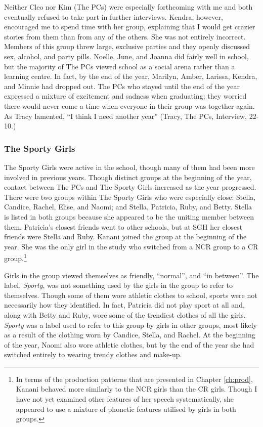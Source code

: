 
Neither Cleo nor Kim (The PCs) were especially forthcoming with me and both eventually refused to take part in further interviews. Kendra, however, encouraged me to spend time with her group, explaining that I would get crazier stories from them than from any of the others. She was not entirely incorrect. Members of this group threw large, exclusive parties and they openly discussed sex, alcohol, and party pills. Noelle, June, and Joanna did fairly well in school, but the majority of The PCs viewed school as a social arena rather than a learning centre. In fact, by the end of the year, Marilyn, Amber, Larissa, Kendra, and Minnie had dropped out. The PCs who stayed until the end of the year expressed a mixture of excitement and sadness when graduating; they worried there would never come a time when everyone in their group was together again. As Tracy lamented, ``I think I need another year'' (Tracy, The PCs, Interview, 22-10.)




\subsubsection{The Sporty Girls}
The Sporty Girls were active in the school, though many of them had been more involved in previous years. Though distinct groups at the beginning of the year, contact between The PCs and The Sporty Girls increased as the year progressed. There were two groups within The Sporty Girls who were especially close: Stella, Candice, Rachel, Elise, and Naomi; and Stella, Patricia, Ruby, and Betty. Stella is listed in both groups because she appeared to be the uniting member between them. Patricia's closest friends went to other schools, but at SGH her closest friends were Stella and Ruby. Kanani joined the group at the beginning of the year. She was the only girl in the study who switched from a NCR group to a CR group.\footnote{In terms of the production patterns that are presented in Chapter \ref{ch:prod}, Kanani behaved more similarly to the NCR girls than the CR girls. Though I have not yet examined other features of her speech systematically, she appeared to use a mixture of phonetic features utilised by girls in both groups.}

Girls in the group viewed themselves as friendly, ``normal'', and ``in between''. The label, \textsl{Sporty}, was not something used by the girls in the group to refer to themselves. Though some of them wore athletic clothes to school, sports were not necessarily how they identified. In fact, Patricia did not play sport at all and, along with Betty and Ruby, wore some of the trendiest clothes of all the girls. \textit{Sporty} was a label used to refer to this group by girls in other groups, most likely as a result of the clothing worn by Candice, Stella, and Rachel. At the beginning of the year, Naomi also wore athletic clothes, but by the end of the year she had switched entirely to wearing trendy clothes and make-up.


